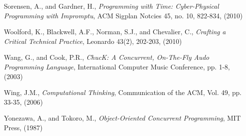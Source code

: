 \documentclass[11pt]{scrartcl}
\begin{document}
\begin{thebibliography}{9}
  Sorensen, A., and Gardner, H.,
  \emph{Programming with Time: Cyber-Physical Programming with Impromptu},
  ACM Sigplan Notcies 45,
  no. 10, 822-834,
  (2010)

  Woolford, K., Blackwell, A.F., Norman, S.J., and Chevalier, C.,
  \emph{Crafting a Critical Technical Practice},
  Leonardo 43(2),
  202-203,
  (2010)

  Wang, G., and Cook, P.R.,
  \emph{ChucK: A Concurrent, On-The-Fly Audo Programming Language},
  International Computer Music Conference,
  pp. 1-8,
  (2003)

  Wing, J.M.,
  \emph{Computational Thinking},
  Communication of the ACM,
  Vol. 49, pp. 33-35,
  (2006)

  Yonezawa, A., and Tokoro, M.,
  \emph{Object-Oriented Concurrent Programming},
  MIT Press,
  (1987)

\end{thebibliography}
\end{document}
